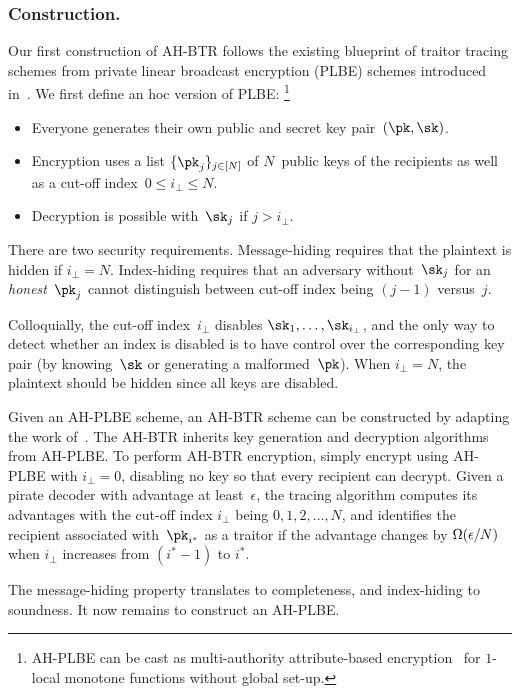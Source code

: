 \subsubsection{Construction.}
Our first construction of AH-BTR follows the existing blueprint of traitor tracing schemes from private linear broadcast encryption (PLBE) schemes introduced in~\cite{EC:BonSahWat06}.
We first define an \ad hoc version of PLBE:%
\footnote{AH-PLBE can be cast as multi-authority attribute-based encryption~\cite{TCC:Chase07} for $1$-local monotone functions without global set-up.}
\begin{itemize}
\item Everyone generates their own public and secret key pair~$(\pk,\sk)$.
\item Encryption uses a list $\{\pk_j\}_{j\in[N]}$ of $N$~public keys of the recipients as well as a cut-off index~${0\leq i_\bot\leq N}$.
\item Decryption is possible with~$\sk_j$ if ${j>i_\bot}$.
\end{itemize}
There are two security requirements.
Message-hiding requires that the plaintext is hidden if ${i_\bot=N}$.
Index-hiding requires that an adversary without~$\sk_j$ for an \emph{honest}~$\pk_j$ cannot distinguish between cut-off index being ${(j-1)}$ versus~$j$.

Colloquially, the cut-off index~$i_\bot$ disables $\sk_1,\dots,\sk_{i_\bot}$, and
the only way to detect whether an index is disabled is to have control over the corresponding key pair (by knowing~$\sk$ or generating a malformed~$\pk$).
When ${i_\bot=N}$, the plaintext should be hidden since all keys are disabled.

Given an AH-PLBE scheme, an AH-BTR scheme can be constructed by adapting the work of~\cite{EC:BonSahWat06}.
The AH-BTR inherits key generation and decryption algorithms from AH-PLBE.
To perform AH-BTR encryption, simply encrypt using AH-PLBE with ${i_\bot=0}$, disabling no key so that every recipient can decrypt.
Given a pirate decoder with advantage at least~$\epsilon$, the tracing algorithm computes its advantages with the cut-off index $i_\bot$ being ${0,1},\allowbreak{2,\dots,N}$, and identifies the recipient associated with~$\pk_{i^\ast}$ as a traitor if the advantage changes by $\bigOmega(\epsilon/N)$ when $i_\bot$ increases from $({i^\ast-1})$ to $i^\ast$.

The message-hiding property translates to completeness, and index-hiding to soundness.
It now remains to construct an AH-PLBE.

